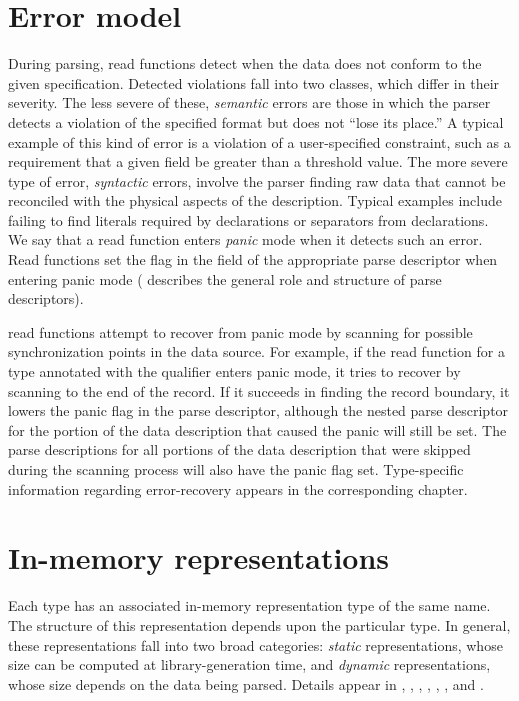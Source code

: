 \section{Error model}
\label{sec:common-error-model}
During parsing, \pads{} read functions detect when the data does not
conform to the given specification.  Detected violations fall into two
classes, which differ in their severity.  The less severe of these,
\textit{semantic} errors are those in which the parser detects a
violation of the specified format but does not ``lose its place.''  A
typical example of this kind of error is a violation of a
user-specified constraint, such as a requirement that a given field be
greater than a threshold value.  The more severe type of error,
\textit{syntactic} errors, involve the parser finding raw data that
cannot be reconciled with the physical aspects of the description.
Typical examples include failing to find literals required by
\Pstruct{} declarations or separators from \Parray{} declarations. We
say that a read function enters \textit{panic} mode when it detects
such an error. Read functions set the  flag in the
 field of the appropriate parse descriptor when entering
panic mode ( describes the general
role and structure of parse descriptors).

\pads{} read functions attempt to recover from panic mode by scanning
for possible synchronization points in the data source.
For example, if the read function for a \pads{} type  annotated with
the \Precord{} qualifier enters panic mode, it tries to
recover by scanning to the end of the record.  If it succeeds in
finding the record boundary, it lowers the panic flag in the 
parse descriptor, although the nested parse descriptor for the portion
of the data description that caused the panic will still be set.  The parse
descriptions for all portions of the data description that were
skipped during the scanning process will also have the panic flag set.
Type-specific information regarding error-recovery appears in the
corresponding chapter.



\section{In-memory representations}
\label{sec:common-rep}
Each \PADS{} type  has an associated in-memory representation
type of the same name.  The structure of this representation depends
upon the particular \PADS{} type.  
In general, these representations fall into two broad categories:
\textit{static} representations, whose size can be computed at
library-generation time, and \textit{dynamic} representations, whose size 
depends on the data being parsed. 
Details appear in 
, ,
, , 
, , 
and .

